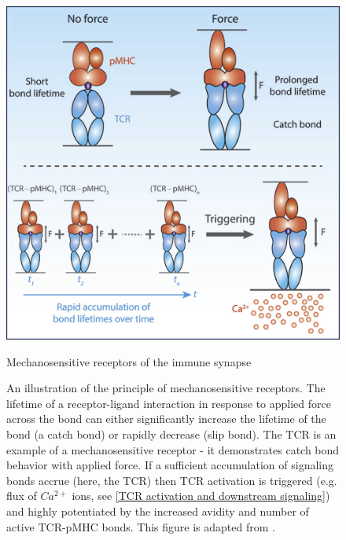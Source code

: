 \begin{figure}[htbp]
	\centering
	\includegraphics[width=0.8\columnwidth]{../figures/chapter1/tcrcatchbond.jpg}
	\caption{Mechanosensitive receptors of the immune synapse}
	\caption*{An illustration of the principle of mechanosensitive receptors. The lifetime of a receptor-ligand interaction in response to applied force across the bond can either significantly increase the lifetime of the bond (a catch bond) or rapidly decrease (slip bond). The TCR is an example of a mechanosensitive receptor - it demonstrates catch bond behavior with applied force. If a sufficient accumulation of signaling bonds accrue (here, the TCR) then TCR activation is triggered (e.g. flux of $Ca^{2+}$ ions, see \ref{TCR activation and downstream signaling}) and highly potentiated by the increased avidity and number of active TCR-pMHC bonds. This figure is adapted from \cite{Liu2014}.}
	\label{fig:tcrcatchbond}
\end{figure}

